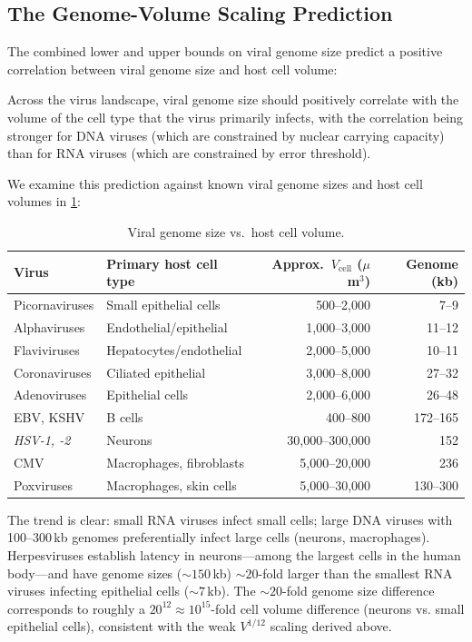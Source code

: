 \subsection{The Genome-Volume Scaling Prediction}

The combined lower and upper bounds on viral genome size predict a positive correlation between viral genome size and host cell volume:

\begin{proposition}
\label{v:prop:genome_volume}
Across the virus landscape, viral genome size should positively correlate with the volume of the cell type that the virus primarily infects, with the correlation being stronger for DNA viruses (which are constrained by nuclear carrying capacity) than for RNA viruses (which are constrained by error threshold).
\end{proposition}

We examine this prediction against known viral genome sizes and host cell volumes in \cref{v:tab:genome_scaling}:

\begin{table}[h]
\centering
\caption{Viral genome size vs.\ host cell volume.}
\label{v:tab:genome_scaling}
\begin{tabular}{p{3.2cm}lrr}
\toprule
Virus & Primary host cell type & Approx.\ $V_{\mathrm{cell}}$ ($\mu$m$^3$) & Genome (kb) \\
\midrule
Picornaviruses & Small epithelial cells & 500--2,000 & 7--9 \\
Alphaviruses & Endothelial/epithelial & 1,000--3,000 & 11--12 \\
Flaviviruses & Hepatocytes/endothelial & 2,000--5,000 & 10--11 \\
Coronaviruses & Ciliated epithelial & 3,000--8,000 & 27--32 \\
Adenoviruses & Epithelial cells & 2,000--6,000 & 26--48 \\
EBV, KSHV & B cells & 400--800 & 172--165 \\
\textit{HSV-1, -2} & Neurons & 30,000--300,000 & 152 \\
CMV & Macrophages, fibroblasts & 5,000--20,000 & 236 \\
Poxviruses & Macrophages, skin cells & 5,000--30,000 & 130--300 \\
\bottomrule
\end{tabular}
\end{table}

The trend is clear: small RNA viruses infect small cells; large DNA viruses with 100--300\,kb genomes preferentially infect large cells (neurons, macrophages). Herpesviruses establish latency in neurons---among the largest cells in the human body---and have genome sizes ($\sim\!150$\,kb) $\sim\!20$-fold larger than the smallest RNA viruses infecting epithelial cells ($\sim\!7$\,kb). The $\sim\!20$-fold genome size difference corresponds to roughly a $20^{12} \approx 10^{15}$-fold cell volume difference (neurons vs. small epithelial cells), consistent with the weak $V^{1/12}$ scaling derived above.

